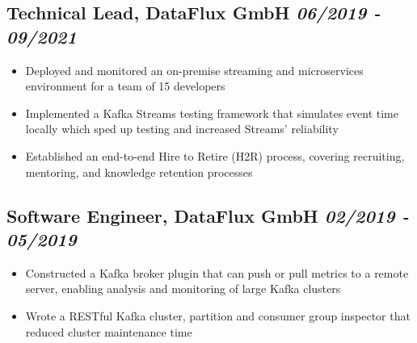 \documentclass[a4paper]{article}
\newcommand{\bolditalicpair}
[2]
{\textbf{#1} \texorpdfstring{\hfill}{} \textit{#2}}
\begin{document}
\subsection{\bolditalicpair{Technical Lead, DataFlux GmbH}{06/2019 - 09/2021}}

\begin{itemize}
 \item Deployed and monitored an on-premise streaming and microservices environment for a team of 15 developers
 \item Implemented a Kafka Streams testing framework that simulates event time locally which sped up testing and increased Streams' reliability
 \item Established an end-to-end Hire to Retire (H2R) process, covering recruiting, mentoring, and knowledge retention processes
\end{itemize}

\subsection{\bolditalicpair{Software Engineer, DataFlux GmbH}{02/2019 - 05/2019}}

\begin{itemize}
  \item Constructed a Kafka broker plugin that can push or pull metrics to a remote server, enabling analysis and monitoring of large Kafka clusters
  \item Wrote a RESTful Kafka cluster, partition and consumer group inspector that reduced cluster maintenance time
\end{itemize}


\end{document}
